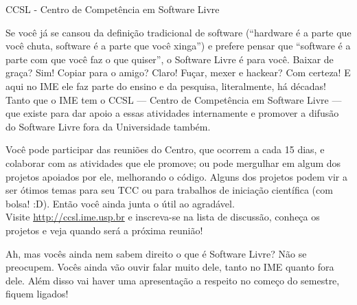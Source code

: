 \begin{secao}{CCSL - Centro de Competência em Software Livre}

Se você já se cansou da definição tradicional de software (``hardware é a parte
que você chuta, software é a parte que você xinga'') e prefere pensar que
``software é a parte com que você faz o que quiser'', o Software Livre é para você. 
Baixar de graça? Sim! Copiar para o amigo? Claro! Fuçar, mexer e hackear? Com
 certeza! E aqui no IME ele faz parte do ensino e da pesquisa, literalmente, há
 décadas! Tanto que o IME tem o CCSL --- Centro de Competência em Software Livre
 --- que existe para dar apoio a essas atividades internamente e promover a
 difusão do Software Livre fora da Universidade também.

Você pode participar das reuniões do Centro, que ocorrem a cada 15 dias, e
 colaborar com as atividades que ele promove; ou pode mergulhar em algum dos
 projetos apoiados por ele, melhorando o código. Alguns dos projetos podem vir a
 ser ótimos temas para seu TCC ou para trabalhos de iniciação científica (com
 bolsa! :D). Então você ainda junta o útil ao agradável.\\
Visite \url{http://ccsl.ime.usp.br} e inscreva-se na lista de discussão,
 conheça os projetos e veja quando será a próxima reunião!

Ah, mas vocês ainda nem sabem direito o que é Software Livre? Não se preocupem.
Vocês ainda vão ouvir falar muito dele, tanto no IME quanto fora dele. Além
disso vai haver uma apresentação a respeito no começo do semestre, fiquem ligados! %

\end{secao}
